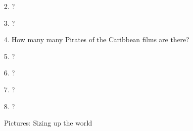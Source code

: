 \begin{frame}
\begin{center}
\Large
2. ?
\\
\end{center}
\end{frame}
\begin{frame}
\begin{center}
\Large
3. ?
\\
\end{center}
\end{frame}
\begin{frame}
\begin{center}
\Large
4. How many many Pirates of the Caribbean films are there?
\\
\end{center}
\end{frame}
\begin{frame}
\begin{center}
\Large
5. ?
\\
\end{center}
\end{frame}
\begin{frame}
\begin{center}
\Large
6. ?
\\
\end{center}
\end{frame}
\begin{frame}
\begin{center}
\Large
7. ?
\\
\end{center}
\end{frame}
\begin{frame}
\begin{center}
\Large
8. ?
\\
\end{center}
\end{frame}
\begin{frame}
\begin{center}
\Huge
Pictures: Sizing up the world
\end{center}
\end{frame}
